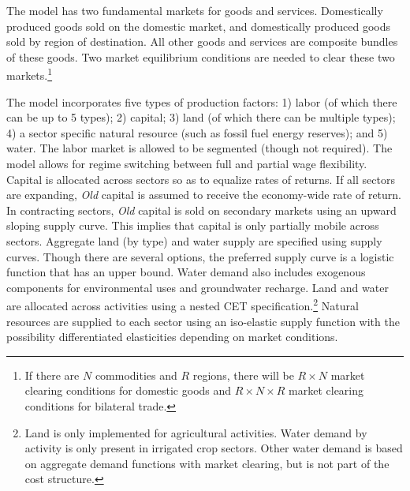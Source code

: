 \documentclass[11pt,letterpaper]{report}
\begin{document}
The model has two fundamental markets for goods and services. Domestically
produced goods sold on the domestic market, and domestically produced goods sold
by region of destination. All other goods and services are composite bundles of
these goods. Two market equilibrium conditions are needed to clear these two
markets.\footnote{If there are $N$ commodities and $R$ regions, there will be
$R \times N$ market clearing conditions for domestic goods and $R \times N
\times R$ market clearing conditions for bilateral trade.}

The model incorporates five types of production factors: 1) labor (of which
there can be up to 5 types); 2) capital; 3) land (of which there
can be multiple types); 4) a sector specific natural
resource (such as fossil fuel energy reserves); and 5) water. The labor market
is allowed to be segmented (though not required). The model allows for regime
switching between full and partial wage flexibility. Capital is allocated across
sectors so as to equalize rates of returns. If all sectors are expanding,
\emph{Old} capital is assumed to receive the economy-wide rate of return. In
contracting sectors, \emph{Old} capital is sold on secondary markets using an
upward sloping supply curve. This implies that capital is only partially mobile
across sectors. Aggregate land (by type) and water supply are specified using supply
curves. Though there are several options, the preferred supply curve is a
logistic function that has an upper bound. Water demand also includes exogenous
components for environmental uses and groundwater recharge. Land and water are
allocated across activities using a nested CET specification.\footnote{Land is
only implemented for agricultural activities. Water demand by activity is only
present in irrigated crop sectors. Other water demand is based on aggregate
demand functions with market clearing, but is not part of the cost structure.}
Natural resources are supplied to each sector using an iso-elastic supply
function with the possibility differentiated elasticities depending on market
conditions.
\end{document}
